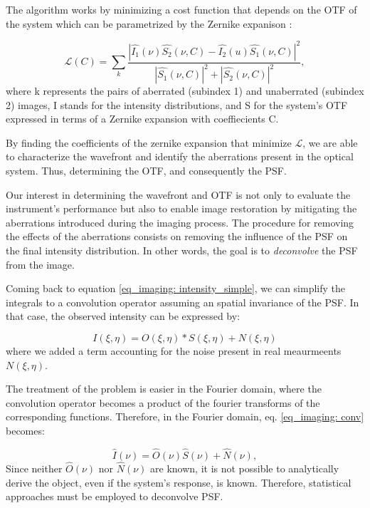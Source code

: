 The algorithm works by minimizing a cost function that depends on the OTF of the system which can be parametrized by the Zernike expanison \citep{pd_cost}: 

\begin{equation}
  \mathcal{L} (C) = \sum _ {k} \frac{|\hat{I_1} (\nu ) \hat{S_2} (\nu , C) - \hat{I_2}(u) \hat{S_1}(\nu , C)| ^2}{|\hat{S_1}(\nu , C)| ^2 + |\hat{S_2}(\nu , C)| ^2} , 
\end{equation}
where k represents the pairs of aberrated (subindex 1) and unaberrated (subindex 2) images, I stands for the intensity distributions, and S for the system's OTF expressed in terms of a Zernike expansion with coeffiecients C. 

By finding the coefficients of the zernike expansion that minimize $\mathcal{L}$, we are able to characterize the wavefront and identify the aberrations present in the optical system. Thus, determining the OTF, and consequently the PSF.

Our interest in determining the wavefront and OTF is not only to evaluate the instrument's performance but also to enable image restoration by mitigating the aberrations introduced during the imaging process. The procedure for removing the effects of the aberrations consists on removing the influence of the PSF on the final intensity distribution. In other words, the goal is to \textit{deconvolve} the PSF from the image.

Coming back to equation \eqref{eq_imaging: intensity_simple}, we can simplify the integrals to a convolution operator assuming an spatial invariance of the PSF. In that case, the observed intensity can be expressed by:

\begin{equation}
  I(\xi, \eta) = O(\xi, \eta) * S(\xi, \eta) + N (\xi, \eta)
  \label{eq_imaging: conv} 
\end{equation}  
where we added a term accounting for the noise present in real meaurmeents $N (\xi, \eta)$.

The treatment of the problem is easier in the Fourier domain, where the convolution operator becomes a product of the fourier transforms of the corresponding functions. Therefore, in the Fourier domain, eq. \ref{eq_imaging: conv} becomes: 

\begin{equation}
  \hat{I}(\nu ) = \hat{O}(\nu)\hat{S}(\nu)+\hat{N}(\nu),
\end{equation}
Since neither $\hat{O}(\nu)$ nor $\hat{N}(\nu)$ are known, it is not possible to analytically derive the object, even if the system's response, is known. Therefore, statistical approaches must be employed to deconvolve PSF.

